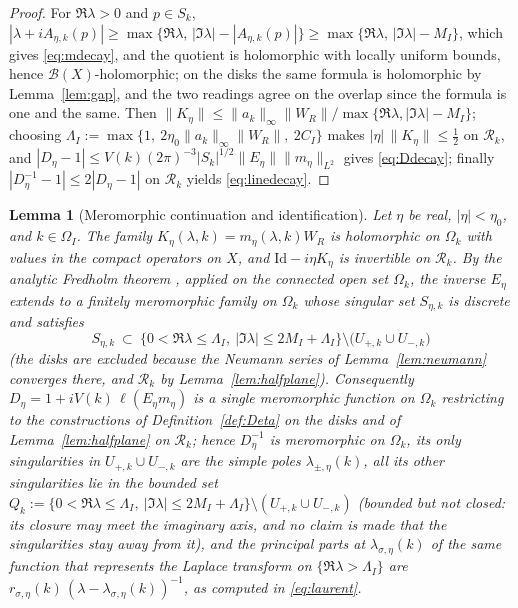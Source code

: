 \documentclass[11pt,a4paper]{amsart}
\newtheorem{lemma}[theorem]{Lemma}
\theoremstyle{definition}
\theoremstyle{remark}
\newcommand{\Id}{\mathrm{Id}}
\newcommand{\ellf}{\ell}
\begin{document}
\begin{proof}
For $\Re\lambda>0$ and $p\in S_k$,
$|\lambda+iA_{\eta,k}(p)|\ge\max\{\Re\lambda,\,|\Im\lambda|-|A_{\eta,k}(p)|\}\ge\max\{\Re\lambda,\,|\Im\lambda|-M_I\}$,
which gives \eqref{eq:mdecay}, and the quotient is holomorphic with locally uniform bounds, hence $\mathcal B(X)$-holomorphic; on the disks the same formula is holomorphic by Lemma~\ref{lem:gap}, and the two readings agree on the overlap since the formula is one and the same. Then $\|K_\eta\|\le\|a_k\|_\infty\|W_R\|/\max\{\Re\lambda,|\Im\lambda|-M_I\}$; choosing $\Lambda_I:=\max\{1,\ 2\eta_0\|a_k\|_\infty\|W_R\|,\ 2C_I\}$ makes $|\eta|\,\|K_\eta\|\le\frac12$ on $\mathcal R_k$, and
$|D_\eta-1|\le V(k)(2\pi)^{-3}|S_k|^{1/2}\|E_\eta\|\|m_\eta\|_{L^2}$ gives \eqref{eq:Ddecay}; finally $|D_\eta^{-1}-1|\le2|D_\eta-1|$ on $\mathcal R_k$ yields \eqref{eq:linedecay}.
\end{proof}

\begin{lemma}[Meromorphic continuation and identification]\label{lem:continuation}
Let $\eta$ be real, $|\eta|<\eta_0$, and $k\in\Omega_I$. The family $K_\eta(\lambda,k)=m_\eta(\lambda,k)W_R$ is holomorphic on $\Omega_k$ with values in the compact operators on $X$, and $\Id-i\eta K_\eta$ is invertible on $\mathcal R_k$. By the analytic Fredholm theorem \cite[Theorem~VI.14]{ReedSimon}, applied on the \emph{connected} open set $\Omega_k$, the inverse $E_\eta$ extends to a finitely meromorphic family on $\Omega_k$ whose singular set $S_{\eta,k}$ is discrete and satisfies
\[
S_{\eta,k}\ \subset\ \bigl\{0<\Re\lambda\le\Lambda_I,\ |\Im\lambda|\le2M_I+\Lambda_I\bigr\}\setminus\bigl(U_{+,k}\cup U_{-,k}\bigr)
\]
(the disks are excluded because the Neumann series of Lemma~\ref{lem:neumann} converges there, and $\mathcal R_k$ by Lemma~\ref{lem:halfplane}). Consequently $D_\eta=1+iV(k)\,\ellf(E_\eta m_\eta)$ is a \emph{single} meromorphic function on $\Omega_k$ restricting to the constructions of Definition~\ref{def:Deta} on the disks and of Lemma~\ref{lem:halfplane} on $\mathcal R_k$; hence $D_\eta^{-1}$ is meromorphic on $\Omega_k$, its only singularities in $U_{+,k}\cup U_{-,k}$ are the simple poles $\lambda_{\pm,\eta}(k)$, all its other singularities lie in the bounded set $Q_k:=\{0<\Re\lambda\le\Lambda_I,\ |\Im\lambda|\le2M_I+\Lambda_I\}\setminus(U_{+,k}\cup U_{-,k})$ (bounded but not closed: its closure may meet the imaginary axis, and no claim is made that the singularities stay away from it), and the principal parts at $\lambda_{\sigma,\eta}(k)$ of the same function that represents the Laplace transform on $\{\Re\lambda>\Lambda_I\}$ are $r_{\sigma,\eta}(k)\,(\lambda-\lambda_{\sigma,\eta}(k))^{-1}$, as computed in \eqref{eq:laurent}.
\end{lemma}
\end{document}
